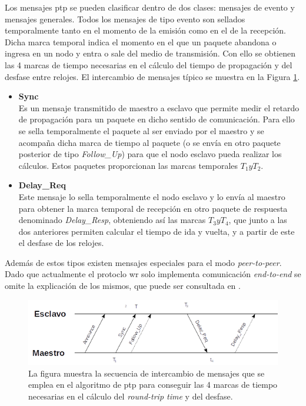 
Los mensajes \gls{ptp} se pueden clasificar dentro de dos clases: mensajes de 
evento y mensajes generales. Todos los mensajes de tipo evento son sellados 
temporalmente tanto en el momento de la emisión como en el de la recepción. 
Dicha marca temporal indica el momento en el que un paquete abandona o ingresa 
en un nodo y entra o sale del medio de transmisión. Con ello se obtienen las 4 
marcas de tiempo necesarias en el cálculo del tiempo de propagación y del 
desfase entre relojes. El intercambio de mensajes típico se muestra en la 
Figura \ref{fig:ptpts}.


\begin{itemize}
	
	\item \textbf{Sync} \\
	Es un mensaje transmitido de maestro a esclavo que permite medir el retardo 
	de propagación para un paquete en dicho sentido de comunicación. Para ello 
	se sella temporalmente el paquete al ser enviado por el maestro y se 
	acompaña dicha marca de tiempo al paquete (o se envía en otro paquete 
	posterior de tipo \textit{Follow\_Up}) para que el nodo esclavo pueda 
	realizar los cálculos. Estos paquetes proporcionan las marcas temporales 
	$T_1 y T_2$.
	
	\item \textbf{Delay\_Req} \\
	Este mensaje lo sella temporalmente el nodo esclavo y lo envía al maestro 
	para obtener la marca temporal de recepción en otro paquete de respuesta 
	denominado \textit{Delay\_Resp}, obteniendo así las marcas $T_3 y T_4$, que 
	junto a las dos anteriores permiten calcular el tiempo de ida y vuelta, y a 
	partir de este el desfase de los relojes.
\end{itemize}

Además de estos tipos existen mensajes especiales para el modo 
\textit{peer-to-peer}. Dado que actualmente el protoclo \gls{wr} solo 
implementa comunicación \textit{end-to-end} se omite la explicación de los 
mismos, que puede ser consultada en \cite{IEEE1588-2008}.

\begin{figure}
	\centering
	\includegraphics[width=0.7\linewidth]{imagenes/ptp_ts}
	\caption[Intercambio de mensajes para el algoritmo de \acrshort{ptp}]{La 
	figura muestra la secuencia de intercambio de mensajes 
	que se emplea en el algoritmo de \gls{ptp} para conseguir las 4 marcas de 
	tiempo necesarias en el cálculo del \textit{round-trip time} y del desfase.}
	\label{fig:ptpts}
\end{figure}

